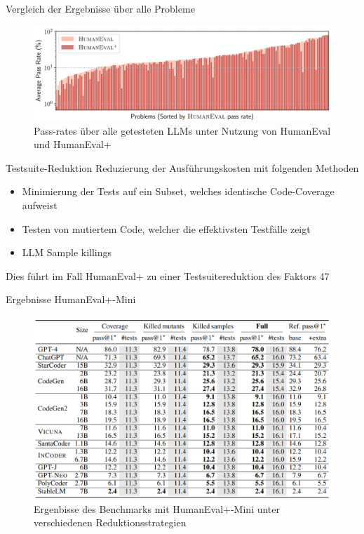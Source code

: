 \documentclass{beamer}              %
\begin{document}
\begin{frame}{Vergleich der Ergebnisse über alle Probleme}
    \begin{figure}
        \centering
        \includegraphics[width=0.8\paperwidth]{images/evalandevalpluscompare.png}
        \caption{Pass-rates über alle getesteten LLMs unter Nutzung von HumanEval und HumanEval+\cite{liu2024your}}
    \end{figure}
\end{frame}

\begin{frame}{Testsuite-Reduktion}
Reduzierung der Ausführungskosten mit folgenden Methoden\cite{liu2024your}
\begin{itemize}
    \item Minimierung der Tests auf ein Subset, welches identische Code-Coverage aufweist
    \item Testen von mutiertem Code, welcher die effektivsten Testfälle zeigt
    \item LLM Sample killings
\end{itemize}
Dies führt im Fall HumanEval+ zu einer Testsuitereduktion des Faktors 47
\end{frame}

\begin{frame}{Ergebnisse HumanEval+-Mini}
    \begin{figure}
        \centering
        \includegraphics[width=0.8\paperwidth]{images/reducedresults.png}
        \caption{Ergenbisse des Benchmarks mit HumanEval+-Mini unter verschiedenen Reduktionsstrategien\cite{liu2024your}}
    \end{figure}
\end{frame}
\end{document}
